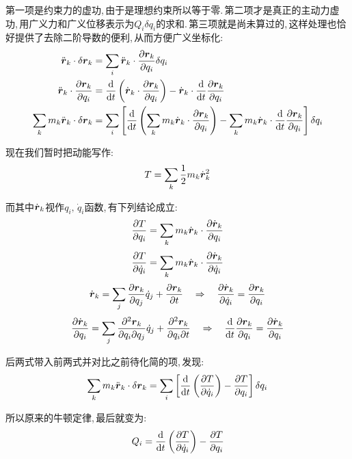 第一项是约束力的虚功,\,由于是理想约束所以等于零.\,第二项才是真正的主动力虚功,\,用广义力和广义位移表示为$Q_i\delta q_i$的求和.\,第三项就是尚未算过的,\,这样处理也恰好提供了去除二阶导数的便利,\,从而方便广义坐标化:
\begin{align*}
  \ddot{\boldsymbol{r}}_k\cdot \delta \boldsymbol{r}_k                        & =\sum_i\ddot{\boldsymbol{r}}_k\cdot \frac{\partial \boldsymbol{r}_k}{\partial q_i}\delta q_i                                                                                                                                                \\
  \ddot{\boldsymbol{r}}_k\cdot \frac{\partial \boldsymbol{r}_k}{\partial q_i} & =\frac{\textrm{d} }{\textrm{d} t}\left(\dot {\boldsymbol{r}}_k\cdot \frac{\partial \boldsymbol{r}_k}{\partial q_i}\right)- \dot {\boldsymbol{r}}_k\cdot \frac{\textrm{d} }{\textrm{d} t}\frac{\partial \boldsymbol{r}_k}{\partial q_i}                                                  \\
  \sum_k m_k \ddot{\boldsymbol{r}}_k\cdot \delta \boldsymbol{r}_k             & =\sum_i\left[\frac{\textrm{d} }{\textrm{d} t}\left(\sum_k m_k\dot {\boldsymbol{r}}_k\cdot \frac{\partial \boldsymbol{r}_k}{\partial q_i}\right)- \sum_k m_k\dot {\boldsymbol{r}}_k\cdot \frac{\textrm{d} }{\textrm{d} t}\frac{\partial \boldsymbol{r}_k}{\partial q_i}\right]\delta q_i
\end{align*}

现在我们暂时把动能写作:
\[T=\sum_k\frac{1}{2}m_k \dot {\boldsymbol{r}}_k^2\]

而其中$\dot {\boldsymbol{r}}_k$视作$q_i,\,\dot{q}_i$函数,\,有下列结论成立:
\[\frac{\partial T}{\partial q_i}=\sum_k m_k\dot {\boldsymbol{r}}_k\cdot \frac{\partial \dot {\boldsymbol{r}}_k}{\partial q_i}\]
\[\frac{\partial T}{\partial \dot{q}_i}=\sum_k m_k\dot {\boldsymbol{r}}_k\cdot \frac{\partial \dot {\boldsymbol{r}}_k}{\partial \dot{q}_i}\]
\[\dot {\boldsymbol{r}}_k=\sum_j\frac{\partial \boldsymbol{r}_k}{\partial q_j}\dot{q}_j+\frac{\partial \boldsymbol{r}_k}{\partial t}\quad\Rightarrow \quad \frac{\partial \dot {\boldsymbol{r}}_k}{\partial \dot{q}_i}=\frac{\partial \boldsymbol{r}_k}{\partial q_i}\]
\[\frac{\partial \dot {\boldsymbol{r}}_k}{\partial q_i}=\sum_j\frac{\partial^2 \boldsymbol{r}_k}{\partial q_i\partial q_j}\dot{q}_j+\frac{\partial^2 \boldsymbol{r}_k}{\partial q_i\partial t}\quad\Rightarrow \quad \frac{\textrm{d} }{\textrm{d} t}\frac{\partial \boldsymbol{r}_k}{\partial q_i}=\frac{\partial \dot {\boldsymbol{r}}_k}{\partial q_i}\]

后两式带入前两式并对比之前待化简的项,\,发现:
\[\sum_k m_k \ddot{\boldsymbol{r}}_k\cdot \delta \boldsymbol{r}_k=\sum_i\left[\frac{\textrm{d} }{\textrm{d} t}\left(\frac{\partial T}{\partial \dot{q}_i}\right)-\frac{\partial T}{\partial q_i}\right]\delta q_i\]

所以原来的牛顿定律,\,最后就变为:
\[Q_i=\frac{\textrm{d} }{\textrm{d} t}\left(\frac{\partial T}{\partial \dot{q}_i}\right)-\frac{\partial T}{\partial q_i}\]

